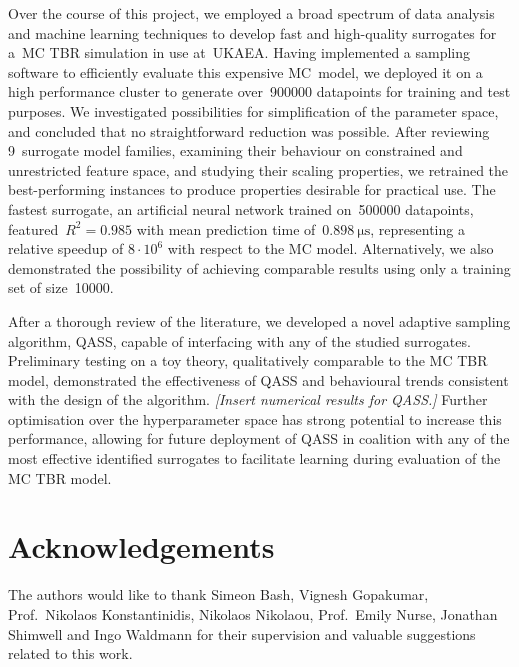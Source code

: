 Over the course of this project, we employed a broad spectrum of data
analysis and machine learning techniques to develop fast and high-quality
surrogates for a~MC TBR simulation in use at~UKAEA. Having implemented a sampling
software to efficiently evaluate this expensive MC~model, we deployed it on a
high performance cluster to generate over~\num{900000}
datapoints for training and test purposes. We
investigated possibilities for simplification of the parameter space, and
concluded that no straightforward reduction was possible. After reviewing
9~surrogate model families, examining their behaviour on constrained and
unrestricted feature space, and studying their scaling properties, we retrained
the best-performing instances to produce properties desirable for
practical use. The fastest surrogate, an artificial neural network trained
on~\num{500000} datapoints, featured~$R^2=\num{0.985}$ with mean prediction time
of~$\SI{0.898}{\micro\second}$, representing a relative
speedup of $8\cdot 10^6$ with respect to the MC model. Alternatively, we
also demonstrated the possibility of achieving comparable results using only a
training set of size~\num{10000}.

After a thorough review of the literature, we developed a novel adaptive
sampling algorithm, QASS, capable of interfacing with any of the studied
surrogates. Preliminary testing on a toy theory, qualitatively comparable to
the MC TBR model, demonstrated the effectiveness of QASS and behavioural trends
consistent with the design of the algorithm. \textit{[Insert numerical results %
for QASS.]} Further optimisation over the hyperparameter space has strong
potential to increase this performance, allowing for future deployment of QASS
in coalition with any of the most effective identified surrogates to facilitate
learning during evaluation of the MC TBR model.


\section*{Acknowledgements}

The authors would like to thank Simeon Bash, Vignesh Gopakumar, Prof.~Nikolaos
Konstantinidis, Nikolaos Nikolaou, Prof.~Emily Nurse, Jonathan Shimwell and Ingo
Waldmann for their supervision and valuable suggestions related to this work.


